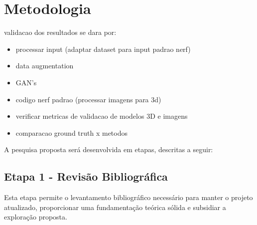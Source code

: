 \section{Metodologia}

validacao dos resultados se dara por:

\begin{itemize}
  \item processar input (adaptar dataset para input padrao nerf)
  \item data augmentation
  \item GAN's
  \item codigo nerf padrao (processar imagens para 3d)
  \item verificar metricas de validacao de modelos 3D e imagens
  \item comparacao ground truth x metodos
\end{itemize}


A pesquisa proposta será desenvolvida em etapas, descritas a seguir:

\subsection{Etapa 1 - Revisão Bibliográfica}

Esta etapa permite o levantamento bibliográfico necessário para manter o projeto atualizado, proporcionar uma fundamentação teórica sólida e subsidiar a exploração proposta.

